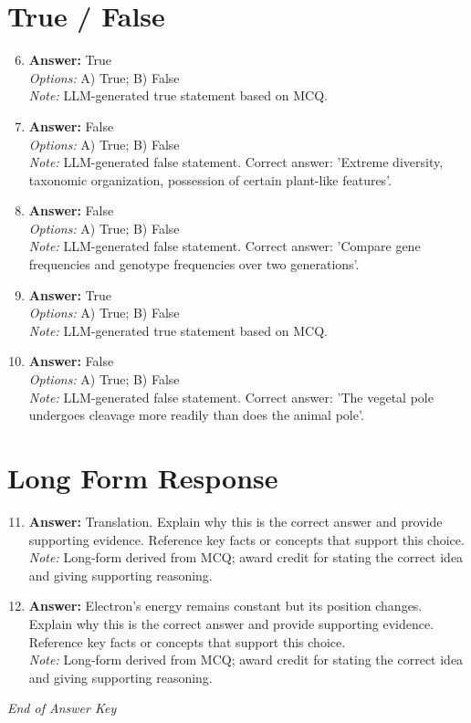 \documentclass[12pt]{article}
\begin{document}
\section*{True / False}
\begin{enumerate}[label=\arabic*.]
\setcounter{enumi}{5}
\item \textbf{Answer:} True
\\ \textit{Options:} A) True; B) False
\\ \textit{Note:} LLM-generated true statement based on MCQ.
\item \textbf{Answer:} False
\\ \textit{Options:} A) True; B) False
\\ \textit{Note:} LLM-generated false statement. Correct answer: 'Extreme diversity, taxonomic organization, possession of certain plant-like features'.
\item \textbf{Answer:} False
\\ \textit{Options:} A) True; B) False
\\ \textit{Note:} LLM-generated false statement. Correct answer: 'Compare gene frequencies and genotype frequencies over two generations'.
\item \textbf{Answer:} True
\\ \textit{Options:} A) True; B) False
\\ \textit{Note:} LLM-generated true statement based on MCQ.
\item \textbf{Answer:} False
\\ \textit{Options:} A) True; B) False
\\ \textit{Note:} LLM-generated false statement. Correct answer: 'The vegetal pole undergoes cleavage more readily than does the animal pole'.
\end{enumerate}

\section*{Long Form Response}
\begin{enumerate}[label=\arabic*.]
\setcounter{enumi}{10}
\item \textbf{Answer:} Translation. Explain why this is the correct answer and provide supporting evidence. Reference key facts or concepts that support this choice.
\\ \textit{Note:} Long-form derived from MCQ; award credit for stating the correct idea and giving supporting reasoning.
\item \textbf{Answer:} Electron's energy remains constant but its position changes. Explain why this is the correct answer and provide supporting evidence. Reference key facts or concepts that support this choice.
\\ \textit{Note:} Long-form derived from MCQ; award credit for stating the correct idea and giving supporting reasoning.
\end{enumerate}

\vfill
\noindent\textit{End of Answer Key}
\end{document}
